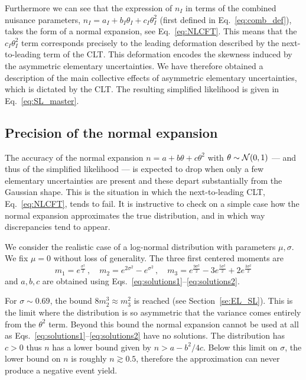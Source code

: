 \documentclass[11pt]{article}
\newcommand{\be}{\begin{equation}}
\newcommand{\ee}{\end{equation}}
\begin{document}
Furthermore we can see that the expression of $n_I$ in terms of the combined nuisance parameters, $n_I=a_I+b_{I}\theta_I+ c_I\theta_I^2$ (first defined in Eq.~\eqref{eq:comb_def}), takes the form of a normal expansion, see Eq.~\eqref{eq:NLCFT}. 
This means that the $c_I \theta_I^2$ term  corresponds  precisely to the leading deformation  described by the next-to-leading term of the CLT.  This deformation encodes the skewness induced by the asymmetric elementary uncertainties. We have therefore obtained  a  description of the main collective effects of asymmetric elementary uncertainties, which is dictated by  the CLT. The resulting  simplified likelihood is given in Eq.~\eqref{eq:SL_master}.



\subsection{Precision of the normal expansion}
\label{se:precision}

The accuracy of the normal expansion $n =  a+ b \theta+ c \theta^2$ with $\theta\sim {\cal N}(0,1)$ --- and thus of the  simplified likelihood --- is expected to drop when only a few elementary  uncertainties are present and these depart substantially from the Gaussian shape. 
This is the %
situation in which the next-to-leading CLT, Eq.~\eqref{eq:NLCFT}, tends to fail.  It is instructive to check  on a simple case how the normal expansion approximates the true distribution, and in which way discrepancies tend to appear.

We consider the realistic  case of a log-normal distribution with parameters $\mu, \sigma$. We fix $\mu=0$ without loss of generality. The three first centered moments are
\be
m_1=e^{\frac{\sigma^2}{2}}\,,\quad m_2=e^{2\sigma^2}-e^{\sigma^2}\,,\quad
m_3=e^{\frac{9\sigma^2}{2}}-3 e^{\frac{5\sigma^2}{2}}+2 e^{\frac{3\sigma^2}{2}}
\ee
and  $a,b,c$ are obtained  using  Eqs.~\eqref{eq:solutions1}--\eqref{eq:solutions2}.

For $\sigma\sim 0.69$, the bound $8m_2^3\approx m_3^2$  is reached (see Section~\ref{se:EL_SL}). This is the limit where
the distribution is so asymmetric that the variance comes entirely from the $\theta^2$ term. Beyond this bound the  normal expansion cannot be used at all as Eqs.~\eqref{eq:solutions1}--\eqref{eq:solutions2} have no solutions.
The distribution has $c>0$ thus $n$ has a lower bound given by $n>a-b^2/4c$. 
Below this limit on $\sigma$, the lower bound on $n$ is roughly $n\gtrsim 0.5$, therefore the approximation can never produce a negative event yield.
\end{document}
